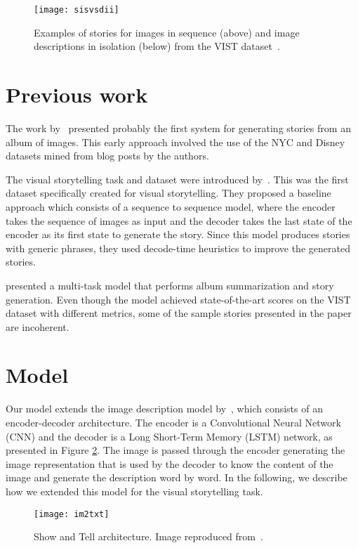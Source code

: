 \documentclass[11pt,a4paper]{article}
\begin{document}
\begin{figure}[tb]
    \centering
    \texttt{[image: sisvsdii]}
    \caption{Examples of stories for images in sequence (above) and image descriptions in isolation (below) from the VIST dataset~\cite{huang2016}.}
    \label{fig:sisvsdii}
\end{figure}

\section{Previous work}

The work by~\cite{parkkim} presented probably the first system for generating stories from an album of images. This early approach involved the use of the NYC and Disney datasets mined from blog posts by the authors.

The visual storytelling task and dataset were introduced by~\cite{huang2016}. This was the first dataset specifically created for visual storytelling. They proposed a baseline approach which consists of a sequence to sequence model, where the encoder takes the sequence of images as input and the decoder takes the last state of the encoder as its first state to generate the story. 
Since this model produces stories with generic phrases, they used decode-time heuristics to improve the generated stories. 

\cite{licheng} presented a multi-task model that performs album summarization and story generation. Even though the model achieved state-of-the-art scores on the VIST dataset with different metrics, some of the sample stories presented in the paper are incoherent. 

\section{Model}
Our model extends the image description model by~\cite{vinyals}, which consists of an encoder-decoder architecture. The encoder is a Convolutional Neural Network (CNN) and the decoder is a Long Short-Term Memory (LSTM) network, as presented in Figure \ref{fig:im2txt}. The image is passed through the encoder generating the image representation that is used by the decoder to know the content of the image and generate the description word by word. In the following, we describe how we extended this model for the visual storytelling task.

\begin{figure}[tb]
    \centering
    \texttt{[image: im2txt]}
    \caption{Show and Tell architecture. Image reproduced from~\cite{vinyals}.}
    \label{fig:im2txt}
\end{figure}
\end{document}
